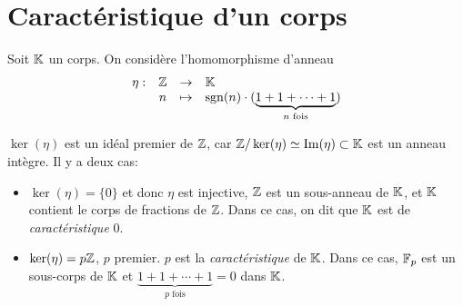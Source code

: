 
\section{Caractéristique d'un corps}
\label{sec:caract-dun-corps}

Soit $\mathbb{K}$ un corps. On considère l'homomorphisme d'anneau 
\[
  \begin{array}{cccl}
    \eta: & \mathbb{Z} & \to & \mathbb{K} \\
    & n & \mapsto & \mathrm{sgn}(n) \cdot (\underbrace{1 + 1 + \cdots + 1}_{n \text{ fois}})
  \end{array}
\]

$\ker(\eta)$ est un idéal premier de $\mathbb{Z}$, car $\mathbb{Z}/\ker(\eta) \simeq \mathrm{Im}(\eta) \subset \mathbb{K}$ est un
anneau intègre. Il y a deux cas:
\begin{itemize}
\item $\ker(\eta) = \{0\}$ et donc $\eta$ est injective, $\mathbb{Z}$ est un sous-anneau de $\mathbb{K}$, et $\mathbb{K}$ contient le
  corps de fractions de $\mathbb{Z}$. Dans ce cas, on dit que $\mathbb{K}$ est de \emph{caractéristique} $0$.

\item $\ker(\eta) = p\mathbb{Z}$, $p$ premier. $p$ est la \emph{caractéristique} de $\mathbb{K}$. Dans ce cas, $\mathbb{F}_p$ est un
  sous-corps de $\mathbb{K}$ et $\underbrace{1 + 1 + \cdots + 1}_{p \text{ fois}} = 0$ dans $\mathbb{K}$.
\end{itemize}


















